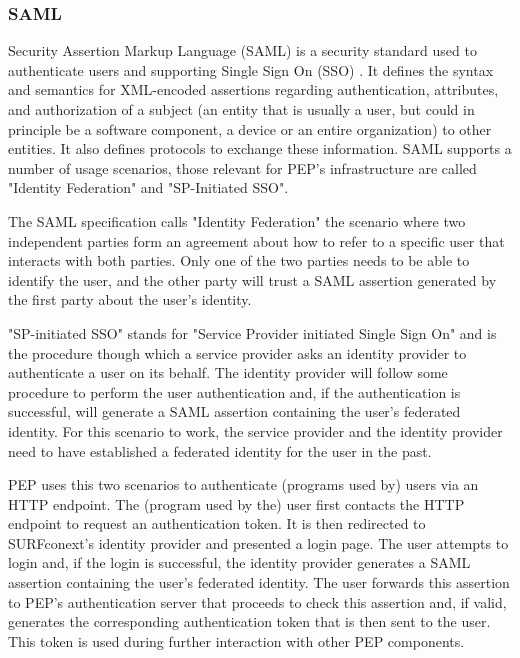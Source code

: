 \documentclass{report}
\begin{document}
\subsubsection{SAML}
Security Assertion Markup Language (SAML) is a security standard used to authenticate users and supporting Single Sign On (SSO) \cite{sstc-saml-core-errata-2.0-wd-07}. It defines
the syntax and semantics for XML-encoded assertions regarding authentication, attributes, and authorization of a subject (an entity that is usually a user, but could in principle
be a software component, a device or an entire organization) to other entities. It also defines protocols to exchange these information. SAML supports a number of usage scenarios, those 
relevant for PEP's infrastructure are called "Identity Federation" and "SP-Initiated SSO". \par
The SAML specification calls "Identity Federation" the scenario where two independent parties form an agreement about how to refer to a specific user that interacts with both
parties. Only one of the two parties needs to be able to identify the user, and the other party will trust a SAML assertion generated by the first party about the user's identity. \par
"SP-initiated SSO" stands for "Service Provider initiated Single Sign On" and is the procedure though which a service provider asks an identity provider to authenticate a user on
its behalf. The identity provider will follow some procedure to perform the user authentication and, if the authentication is successful, will generate a SAML assertion containing
the user's federated identity. For this scenario to work, the service provider and the identity provider need to have established a federated identity for the user in the past.\par
PEP uses this two scenarios to authenticate (programs used by) users via an HTTP endpoint. The (program used by the) user first contacts the HTTP endpoint to request an
authentication token. It is then redirected to SURFconext's identity provider and presented a login page. The user attempts to login and, if the login is successful, the identity
provider generates a SAML assertion containing the user's federated identity. The user forwards this assertion to PEP's authentication server that proceeds to check this assertion
and, if valid, generates the corresponding authentication token that is then sent to the user. This token is used during further interaction with other PEP components. 
\end{document}
